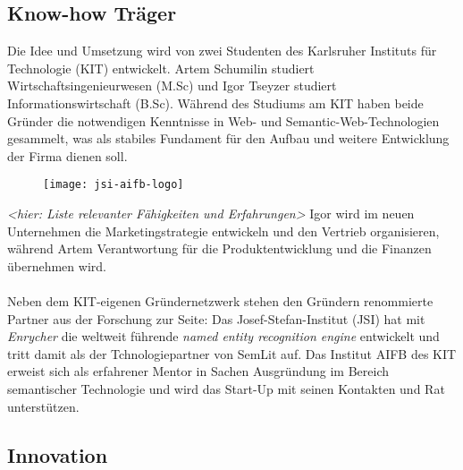 
\subsection{Know-how Träger}
Die Idee und Umsetzung wird von zwei Studenten des Karlsruher Instituts für Technologie (KIT) entwickelt. {\color{orange}Artem Schumilin} studiert Wirtschaftsingenieurwesen (M.Sc) und {\color{orange}Igor Tseyzer} studiert Informationswirtschaft (B.Sc). Während des Studiums am KIT haben beide Gründer die notwendigen Kenntnisse in Web- und Semantic-Web-Technologien gesammelt, was als stabiles Fundament für den Aufbau und weitere Entwicklung der Firma dienen soll. 
\begin{figure}[h!]
\centering
\texttt{[image: jsi-aifb-logo]}
\end{figure}
\emph{<hier: Liste relevanter Fähigkeiten und Erfahrungen>}
Igor wird im neuen Unternehmen die Marketingstrategie entwickeln und den Vertrieb organisieren, während Artem Verantwortung für die Produktentwicklung und die Finanzen übernehmen wird. 
\\
\\
Neben dem KIT-eigenen Gründernetzwerk stehen den Gründern renommierte Partner aus der Forschung zur Seite: 
Das Josef-Stefan-Institut (JSI) hat mit \emph{Enrycher} die weltweit führende \emph{named entity recognition engine} entwickelt und tritt damit als der Tchnologiepartner von SemLit auf. 
Das Institut AIFB des KIT erweist sich als erfahrener Mentor in Sachen Ausgründung im Bereich semantischer Technologie und wird das Start-Up mit seinen Kontakten und Rat unterstützen.


\subsection{Innovation}


